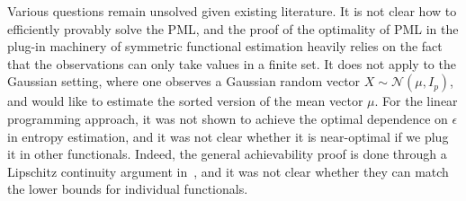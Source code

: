 \documentclass[final,12pt]{colt2018} %
\begin{document}
Various questions remain unsolved given existing literature. It is not clear how to efficiently provably solve the PML, and the proof of the optimality of PML in the plug-in machinery of symmetric functional estimation heavily relies on the fact that the observations can only take values in a finite set. It does not apply to the Gaussian setting, where one observes a Gaussian random vector $X\sim \mathcal{N}(\mu, I_p)$, and would like to estimate the sorted version of the mean vector $\mu$. For the linear programming approach, it was not shown to achieve the optimal dependence on $\epsilon$ in entropy estimation, and it was not clear whether it is near-optimal if we plug it in other functionals. Indeed, the general achievability proof is done through a Lipschitz continuity argument in~\cite{Valiant--Valiant2011}, and it was not clear whether they can match the lower bounds for individual functionals. 
\end{document}
